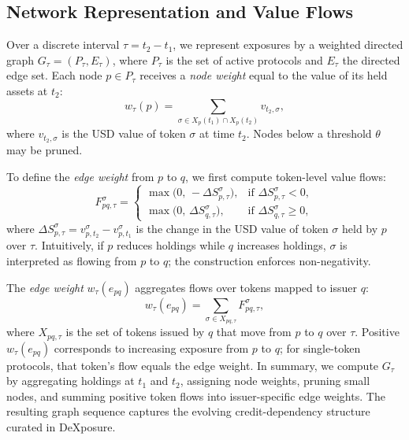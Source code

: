 \subsection{Network Representation and Value Flows}

Over a discrete interval $\tau=t_2-t_1$, we represent exposures by a weighted directed graph $G_\tau=(P_\tau,E_\tau)$, where $P_\tau$ is the set of active protocols and $E_\tau$ the directed edge set. Each node $p\in P_\tau$ receives a \emph{node weight} equal to the value of its held assets at $t_2$:
\begin{equation}
w_\tau(p) = \sum_{\sigma\in X_p(t_1)\cap X_p(t_2)} v_{t_2,\sigma},
\label{eq:node-weight}
\end{equation}
where $v_{t_2,\sigma}$ is the USD value of token $\sigma$ at time $t_2$. Nodes below a threshold $\theta$ may be pruned.

To define the \emph{edge weight} from $p$ to $q$, we first compute token-level value flows:
\begin{equation}
F^{\sigma}_{p q,\tau} =
\begin{cases}
\max\bigl(0,\, -\Delta S^{\sigma}_{p,\tau}\bigr), & \text{if } \Delta S^{\sigma}_{p,\tau} < 0,\\
\max\bigl(0,\,\Delta S^{\sigma}_{q,\tau}\bigr), & \text{if } \Delta S^{\sigma}_{q,\tau} \ge 0,
\end{cases}
\label{eq:value-flow}
\end{equation}
where $\Delta S^{\sigma}_{p,\tau}=v_{p,t_2}^{\sigma}-v_{p,t_1}^{\sigma}$ is the change in the USD value of token $\sigma$ held by $p$ over $\tau$. Intuitively, if $p$ reduces holdings while $q$ increases holdings, $\sigma$ is interpreted as flowing from $p$ to $q$; the construction enforces non-negativity.

The \emph{edge weight} $w_\tau(e_{p q})$ aggregates flows over tokens mapped to issuer $q$:
\begin{equation}
w_\tau(e_{p q}) = \sum_{\sigma \in X_{p q, \tau}} F^{\sigma}_{p q,\tau},
\label{eq:edge-weight}
\end{equation}
where $X_{p q,\tau}$ is the set of tokens issued by $q$ that move from $p$ to $q$ over $\tau$. Positive $w_\tau(e_{p q})$ corresponds to increasing exposure from $p$ to $q$; for single-token protocols, that token's flow equals the edge weight. In summary, we compute $G_\tau$ by aggregating holdings at $t_1$ and $t_2$, assigning node weights, pruning small nodes, and summing positive token flows into issuer-specific edge weights. The resulting graph sequence captures the evolving credit-dependency structure curated in DeXposure.
